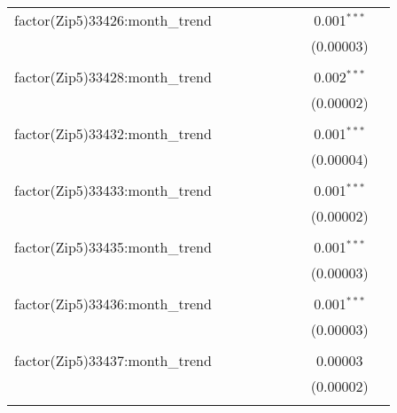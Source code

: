 \begin{table}[H]
{\begin{tabular}{@{\extracolsep{5pt}}lcccccccc}
  factor(Zip5)33426:month\_trend &  &  &  &  &  &  & 0.001$^{***}$ &  \\  

   &  &  &  &  &  &  & (0.00003) &  \\  

   & & & & & & & & \\  

  factor(Zip5)33428:month\_trend &  &  &  &  &  &  & 0.002$^{***}$ &  \\  

   &  &  &  &  &  &  & (0.00002) &  \\  

   & & & & & & & & \\  

  factor(Zip5)33432:month\_trend &  &  &  &  &  &  & 0.001$^{***}$ &  \\  

   &  &  &  &  &  &  & (0.00004) &  \\  

   & & & & & & & & \\  

  factor(Zip5)33433:month\_trend &  &  &  &  &  &  & 0.001$^{***}$ &  \\  

   &  &  &  &  &  &  & (0.00002) &  \\  

   & & & & & & & & \\  

  factor(Zip5)33435:month\_trend &  &  &  &  &  &  & 0.001$^{***}$ &  \\  

   &  &  &  &  &  &  & (0.00003) &  \\  

   & & & & & & & & \\  

  factor(Zip5)33436:month\_trend &  &  &  &  &  &  & 0.001$^{***}$ &  \\  

   &  &  &  &  &  &  & (0.00003) &  \\  

   & & & & & & & & \\  

  factor(Zip5)33437:month\_trend &  &  &  &  &  &  & 0.00003 &  \\  

   &  &  &  &  &  &  & (0.00002) &  \\  

   & & & & & & & & \\  


\end{tabular}}
\end{table}
